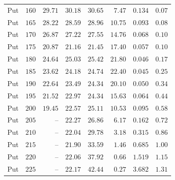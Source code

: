\begin{tabular}{lrrrrrrr}
Put & $160$ & $29.71$ & $30.18$ & $30.65$ & $7.47$ & $0.134$ & $0.07$ \\
Put & $165$ & $28.22$ & $28.59$ & $28.96$ & $10.75$ & $0.093$ & $0.08$ \\
Put & $170$ & $26.87$ & $27.22$ & $27.55$ & $14.76$ & $0.068$ & $0.10$ \\
Put & $175$ & $20.87$ & $21.16$ & $21.45$ & $17.40$ & $0.057$ & $0.10$ \\
Put & $180$ & $24.64$ & $25.03$ & $25.42$ & $21.80$ & $0.046$ & $0.17$ \\
Put & $185$ & $23.62$ & $24.18$ & $24.74$ & $22.40$ & $0.045$ & $0.25$ \\
Put & $190$ & $22.64$ & $23.49$ & $24.34$ & $20.10$ & $0.050$ & $0.34$ \\
Put & $195$ & $21.52$ & $22.97$ & $24.34$ & $15.63$ & $0.064$ & $0.44$ \\
Put & $200$ & $19.45$ & $22.57$ & $25.11$ & $10.53$ & $0.095$ & $0.58$ \\
Put & $205$ & -- & $22.27$ & $26.86$ & $6.17$ & $0.162$ & $0.72$ \\
Put & $210$ & -- & $22.04$ & $29.78$ & $3.18$ & $0.315$ & $0.86$ \\
Put & $215$ & -- & $21.90$ & $33.59$ & $1.46$ & $0.685$ & $1.00$ \\
Put & $220$ & -- & $22.06$ & $37.92$ & $0.66$ & $1.519$ & $1.15$ \\
Put & $225$ & -- & $22.17$ & $42.44$ & $0.27$ & $3.682$ & $1.31$ \\
\bottomrule
\end{tabular}
